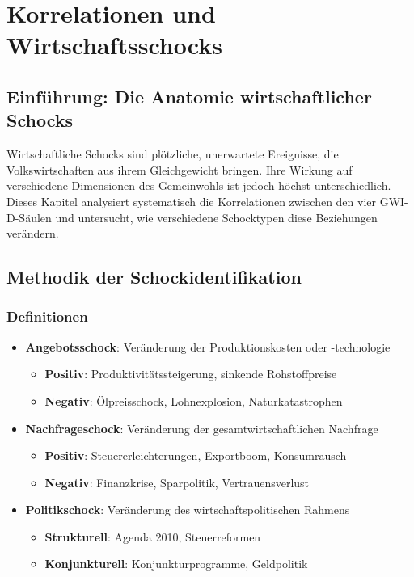 \chapter{Korrelationen und Wirtschaftsschocks}

\section{Einführung: Die Anatomie wirtschaftlicher Schocks}

Wirtschaftliche Schocks sind plötzliche, unerwartete Ereignisse, die Volkswirtschaften aus ihrem Gleichgewicht bringen. Ihre Wirkung auf verschiedene
Dimensionen des Gemeinwohls ist jedoch höchst unterschiedlich. Dieses Kapitel analysiert systematisch die Korrelationen zwischen den vier
GWI-D-Säulen und untersucht, wie verschiedene Schocktypen diese Beziehungen verändern.

\section{Methodik der Schockidentifikation}

\subsection{Definitionen}

\begin{itemize}
\item \textbf{Angebotsschock}: Veränderung der Produktionskosten oder -technologie
  \begin{itemize}
  \item \textbf{Positiv}: Produktivitätssteigerung, sinkende Rohstoffpreise
  \item \textbf{Negativ}: Ölpreisschock, Lohnexplosion, Naturkatastrophen
  \end{itemize}
  
\item \textbf{Nachfrageschock}: Veränderung der gesamtwirtschaftlichen Nachfrage
  \begin{itemize}
  \item \textbf{Positiv}: Steuererleichterungen, Exportboom, Konsumrausch
  \item \textbf{Negativ}: Finanzkrise, Sparpolitik, Vertrauensverlust
  \end{itemize}
  
\item \textbf{Politikschock}: Veränderung des wirtschaftspolitischen Rahmens
  \begin{itemize}
  \item \textbf{Strukturell}: Agenda 2010, Steuerreformen
  \item \textbf{Konjunkturell}: Konjunkturprogramme, Geldpolitik
  \end{itemize}
\end{itemize}

